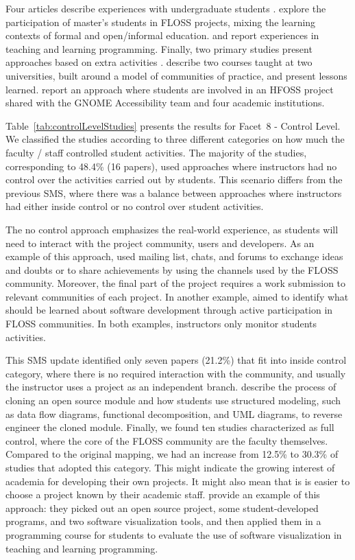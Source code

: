 Four articles describe experiences with undergraduate students \citep{id0089, id0106, id4663, id5328}. 
\citeauthor{id4815} explore the participation of master's students 
in FLOSS projects, mixing the learning contexts of formal and open/informal education. 
\citeauthor{id0134} and \citeauthor{id1097} report experiences in teaching and learning programming. 
Finally, two primary studies
present approaches based on extra activities \cite{id5329, id5335}. 
\citeauthor{id5329} describe two courses taught at two universities, built around a model of communities of practice, and present lessons learned. 
\citeauthor{id5335} report an approach where students are 
involved in an HFOSS project shared with the GNOME Accessibility 
team and four academic institutions.

Table~\ref{tab:controlLevelStudies} presents the results for Facet~8 - Control Level. 
We classified the studies according to 
three different categories on how much 
the faculty / staff controlled student activities.
The majority of the studies, corresponding to 48.4\% (16 papers),
used approaches where instructors had no control over the activities carried out by students. 
This scenario differs from the previous SMS, where there was a balance between approaches where instructors had either inside control or no control over student activities. 

The no control approach emphasizes the real-world experience, 
as students will need to interact with the project community, users and developers. As an example of this approach,  \citeauthor{id4815} used mailing list, chats, and forums to exchange ideas and doubts or to share achievements by using the channels used by the FLOSS community. Moreover, the final part of the project requires a work submission to relevant communities of each project. In another example, \citeauthor{id5546} aimed to identify what should be learned about software development through active participation in FLOSS communities. In both examples, instructors only monitor students activities. 

This SMS update identified only seven papers (21.2\%) that fit into inside control category, 
where there is no required interaction with the community, and usually the instructor uses a project as an independent branch. 
\citeauthor{id0106} describe the process of cloning an open source module 
and how students use structured modeling, such as data flow diagrams, 
functional decomposition, and UML diagrams, to reverse engineer the cloned module.
Finally, we found ten studies characterized as 
full control, where the core of the FLOSS community are 
the faculty themselves. 
Compared to the original mapping, 
we had an increase from 12.5\% to 30.3\% of studies that adopted this category. 
This might indicate the growing interest of academia for developing their own projects. 
It might also mean that is is easier to choose a project known by their academic staff. 
\citeauthor{id0134} provide an example of this approach: 
they picked out an open source project, some student-developed programs, 
and two software visualization tools, and then applied them 
in a programming course for students to evaluate the use of software visualization 
in teaching and learning programming.

